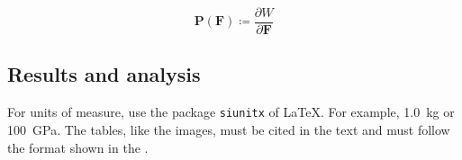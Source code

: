         \begin{equation}\label{eq:PK1}
            \bm{P}(\bm{F}) \coloneqq \frac{\partial W}{\partial \bm{F}}
        \end{equation}

\subsection{Results and analysis}
    For units of measure, use the package \verb|siunitx| of \LaTeX. For example, \SI{1.0}{\kilogram} or \SI{100}{\giga\pascal}.
    The tables, like the images, must be cited in the text and must follow the format shown in the .

